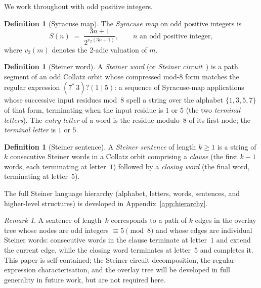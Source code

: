 \documentclass[12pt]{article}
\theoremstyle{definition}
\newtheorem{definition}[theorem]{Definition}
\theoremstyle{remark}
\newtheorem{remark}[theorem]{Remark}
\newcommand{\vt}{v_2}
\newcommand{\Sm}{S}
\begin{document}
We work throughout with odd positive integers.

\begin{definition}[Syracuse map]
\label{def:syracuse}
The \emph{Syracuse map} on odd positive integers is
\[
  \Sm(n) \;=\; \frac{3n+1}{2^{\vt(3n+1)}}, \qquad n \text{ an odd positive integer},
\]
where $\vt(m)$ denotes the 2-adic valuation of $m$.
\end{definition}

\begin{definition}[Steiner word]
\label{def:word}
A \emph{Steiner word} (or \emph{Steiner circuit}~\cite{steiner}) is a
path segment of an odd Collatz orbit whose compressed mod-8 form matches the
regular expression $(7^*\,3)?(1\mid 5)$: a sequence of
Syracuse-map applications whose successive input residues mod~8 spell a string
over the alphabet $\{1,3,5,7\}$ of that form, terminating when the input
residue is $1$ or $5$ (the two \emph{terminal letters}).
The \emph{entry letter} of a word is the residue modulo~8 of its first node;
the \emph{terminal letter} is $1$ or $5$.
\end{definition}

\begin{definition}[Steiner sentence]
\label{def:fullsentence}
A \emph{Steiner sentence} of length $k \geq 1$ is a string of $k$ consecutive
Steiner words in a Collatz orbit comprising a \emph{clause} (the
first $k-1$ words, each terminating at letter~$1$) followed by a \emph{closing
word} (the final word, terminating at letter~$5$).
\end{definition}

The full Steiner language hierarchy (alphabet, letters, words, sentences, and
higher-level structures) is developed in Appendix~\ref{app:hierarchy}.

\begin{remark}
A sentence of length~$k$ corresponds to a path of $k$ edges in the overlay tree
whose nodes are odd integers $\equiv 5 \pmod{8}$ and whose edges are individual
Steiner words: consecutive words in the clause terminate at
letter~$1$ and extend the current edge, while the closing word terminates at
letter~$5$ and completes it.
This paper is self-contained; the Steiner circuit decomposition, the
regular-expression characterisation, and the overlay tree will be developed in
full generality in future work, but are not required here.
\end{remark}
\end{document}
